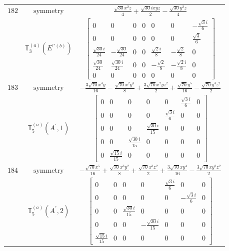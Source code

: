 \documentclass[fleqn,8pt,landscape]{jsarticle}
\begin{document}
\begin{longtable}{ccc}
$ 182 $ & $ \text{symmetry} $ & $ \frac{\sqrt{30} x^{2} z}{4} + \frac{\sqrt{30} i x y z}{2} - \frac{\sqrt{30} y^{2} z}{4} $ \\
$  $ & $ \mathbb{T}_{3}^{(a)}(E^{\prime\prime(b)}) $ & $ \begin{bmatrix} 0 & 0 & 0 & 0 & 0 & 0 & - \frac{\sqrt{3} i}{6} \\ 0 & 0 & 0 & 0 & 0 & 0 & \frac{\sqrt{3}}{6} \\ \frac{\sqrt{30} i}{24} & - \frac{\sqrt{30}}{24} & 0 & 0 & \frac{\sqrt{2} i}{8} & - \frac{\sqrt{2}}{8} & 0 \\ \frac{\sqrt{30}}{24} & \frac{\sqrt{30} i}{24} & 0 & 0 & - \frac{\sqrt{2}}{8} & - \frac{\sqrt{2} i}{8} & 0 \\ 0 & 0 & 0 & 0 & 0 & 0 & 0 \end{bmatrix} $ \\ \hline
$ 183 $ & $ \text{symmetry} $ & $ - \frac{3 \sqrt{70} x^{4} y}{16} - \frac{\sqrt{70} x^{2} y^{3}}{8} + \frac{3 \sqrt{70} x^{2} y z^{2}}{2} + \frac{\sqrt{70} y^{5}}{16} - \frac{\sqrt{70} y^{3} z^{2}}{2} $ \\
$  $ & $ \mathbb{T}_{5}^{(a)}(A^{\prime},1) $ & $ \begin{bmatrix} 0 & 0 & 0 & 0 & 0 & \frac{\sqrt{3} i}{6} & 0 \\ 0 & 0 & 0 & 0 & \frac{\sqrt{3} i}{6} & 0 & 0 \\ 0 & 0 & 0 & \frac{\sqrt{30} i}{15} & 0 & 0 & 0 \\ 0 & 0 & \frac{\sqrt{30} i}{15} & 0 & 0 & 0 & 0 \\ 0 & \frac{\sqrt{15} i}{15} & 0 & 0 & 0 & 0 & 0 \end{bmatrix} $ \\ \hline
$ 184 $ & $ \text{symmetry} $ & $ - \frac{\sqrt{70} x^{5}}{16} + \frac{\sqrt{70} x^{3} y^{2}}{8} + \frac{\sqrt{70} x^{3} z^{2}}{2} + \frac{3 \sqrt{70} x y^{4}}{16} - \frac{3 \sqrt{70} x y^{2} z^{2}}{2} $ \\
$  $ & $ \mathbb{T}_{5}^{(a)}(A^{\prime},2) $ & $ \begin{bmatrix} 0 & 0 & 0 & 0 & \frac{\sqrt{3} i}{6} & 0 & 0 \\ 0 & 0 & 0 & 0 & 0 & - \frac{\sqrt{3} i}{6} & 0 \\ 0 & 0 & \frac{\sqrt{30} i}{15} & 0 & 0 & 0 & 0 \\ 0 & 0 & 0 & - \frac{\sqrt{30} i}{15} & 0 & 0 & 0 \\ \frac{\sqrt{15} i}{15} & 0 & 0 & 0 & 0 & 0 & 0 \end{bmatrix} $ \\ \hline

\end{longtable}
\end{document}
